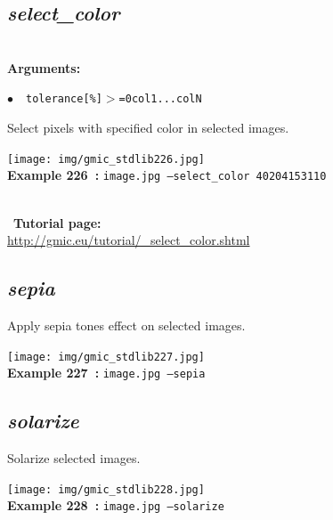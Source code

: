 \documentclass[a4paper,10.5pt,twoside]{book}
\def\comma{\discretionary{,}{}{,}}
\newcommand{\Cb}[1]{\textcolor{cb}{#1}}
\begin{document}
\subsection{\emph{select\_color} }\vspace*{-0.7em}
~\\\textbf{\Cb{Arguments: }}\begin{flushleft}
{\small \Cb{\hspace*{0.5cm}$\bullet$~~\texttt{tolerance[\%]$>$=0{\comma}col1{\comma}...{\comma}colN}}}\end{flushleft}
Select pixels with specified color in selected images.
\begin{center}\texttt{[image: img/gmic\_stdlib226.jpg]}\\
{\footnotesize \textbf{Example 226~:} \texttt{image.jpg --select\_color 40{\comma}204{\comma}153{\comma}110}}
\end{center}
~\\
~\textbf{Tutorial page: }\\\url{http://gmic.eu/tutorial/\_select\_color.shtml}


\subsection{\emph{sepia} }\vspace*{-0.7em}
Apply sepia tones effect on selected images.
\begin{center}\texttt{[image: img/gmic\_stdlib227.jpg]}\\
{\footnotesize \textbf{Example 227~:} \texttt{image.jpg --sepia}}
\end{center}

\subsection{\emph{solarize} }\vspace*{-0.7em}
Solarize selected images.
\begin{center}\texttt{[image: img/gmic\_stdlib228.jpg]}\\
{\footnotesize \textbf{Example 228~:} \texttt{image.jpg --solarize}}
\end{center}
\end{document}
